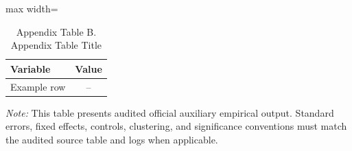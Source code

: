 \documentclass[UTF8]{ctexart}
\begin{document}
\begin{table}[!htbp]
\centering
\caption{Appendix Table B. Appendix Table Title}
\begin{threeparttable}
\small
\begin{adjustbox}{max width=\textwidth}
\begin{tabular}{lc}
\toprule
Variable & Value \\
\midrule
Example row & -- \\
\bottomrule
\end{tabular}
\end{adjustbox}
\begin{tablenotes}
\footnotesize
\item \textit{Note:} This table presents audited official auxiliary empirical output. Standard errors, fixed effects, controls, clustering, and significance conventions must match the audited source table and logs when applicable.
\end{tablenotes}
\end{threeparttable}
\end{table}
\end{document}

